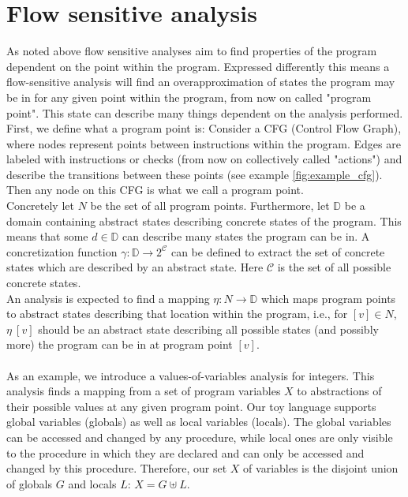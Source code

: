   \section{Flow sensitive analysis}
    As noted above flow sensitive analyses aim to find properties of the program dependent on the point within the program. Expressed differently this means a flow-sensitive analysis will find an overapproximation of states the program may be in for any given point within the program, from now on called "program point". This state can describe many things dependent on the analysis performed.\\
    First, we define what a program point is: Consider a CFG (Control Flow Graph), where nodes represent points between instructions within the program. Edges are labeled with instructions or checks (from now on collectively called "actions") and describe the transitions between these points (see example \autoref{fig:example_cfg}). Then any node on this CFG is what we call a program point.\\
    Concretely let $N$ be the set of all program points. Furthermore, let $\mathbb{D}$ be a domain containing abstract states describing concrete states of the program. This means that some $d \in \mathbb{D}$ can describe many states the program can be in. A concretization function $\gamma: \mathbb{D} \rightarrow 2^{\mathcal{C}}$ can be defined to extract the set of concrete states which are described by an abstract state. Here $\mathcal{C}$ is the set of all possible concrete states.\\ 
    An analysis is expected to find a mapping $\eta: N \rightarrow \mathbb{D}$ which maps program points to abstract states describing that location within the program, i.e., for $[v] \in N$, $\eta\ [v]$ should be an abstract state describing all possible states (and possibly more) the program can be in at program point $[v]$.\\
    \\
    As an example, we introduce a values-of-variables analysis for integers. This analysis finds a mapping from a set of program variables $X$ to abstractions of their possible values at any given program point. Our toy language supports global variables (globals) as well as local variables (locals). The global variables can be accessed and changed by any procedure, while local ones are only visible to the procedure in which they are declared and can only be accessed and changed by this procedure. Therefore, our set $X$ of variables is the disjoint union of globals $G$ and locals $L$: $X = G \uplus L$.
